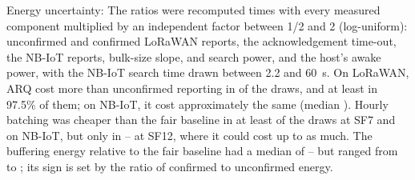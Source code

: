 \documentclass[journal]{IEEEtran}
\begin{document}
Energy uncertainty: The ratios were recomputed \mcDraws{} times with every measured component multiplied by an independent factor between 1/2 and 2 (log-uniform): unconfirmed and confirmed LoRaWAN reports, the acknowledgement time-out, the NB-IoT reports, bulk-size slope, and search power, and the host's awake power, with the NB-IoT search time drawn between 2.2 and 60~s. On LoRaWAN, ARQ cost more than unconfirmed reporting in \mcArqDearer{} of the draws, and at least \mcArqLow{} in 97.5\% of them; on NB-IoT, it cost approximately the same (median \mcNbArqMed). Hourly batching was cheaper than the fair baseline in at least \mcBatchCheapOther{} of the draws at SF7 and on NB-IoT, but only in \mcBatchCheapTwelveMin--\mcBatchCheapTwelveMax{} at SF12, where it could cost up to \mcBatchTwelveHi{} as much. The buffering energy relative to the fair baseline had a median of \mcBufMedMin--\mcBufMedMax{} but ranged from \mcBufLo{} to \mcBufHi{}; its sign is set by the ratio of confirmed to unconfirmed energy.
\end{document}
